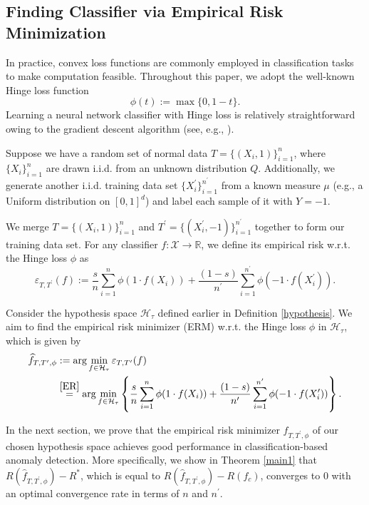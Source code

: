 \documentclass{article}
\def\RR{\mathbb R}
\begin{document}
\subsection{Finding Classifier via Empirical Risk Minimization}
In practice, convex loss functions are commonly employed in classification tasks to make computation feasible.  
Throughout this paper, we adopt the well-known Hinge loss function  $$\phi(t):= \max \{0,1-t\}.$$
Learning a neural network classifier with Hinge loss is relatively straightforward owing to the gradient descent algorithm (see, e.g., \citep{molitor2021bias, george2023training}). 

Suppose we have a random set of normal data $T= \{(X_i,1)\}_{i=1}^{n}$, where  $\{X_i\}_{i=1}^{n}$ are drawn i.i.d. from an unknown distribution $Q$.  
 Additionally, we generate another i.i.d. training data set $\{X_i^\prime\}_{i=1}^{n^\prime}$ from a known measure $\mu$ (e.g., a Uniform distribution on $[0,1]^d$) and label each sample of it with $Y=-1$.
 
We merge $T= \{(X_i,1)\}_{i=1}^{n}$ and $T^\prime= \{(X_i^\prime,-1)\}_{i=1}^{n^\prime}$ together to form our training data set.
For any classifier $f: \mathcal{X} \to \RR$, we define its empirical risk w.r.t. the Hinge loss $\phi$ as 
\begin{equation}\label{ER}
    \varepsilon_{T,T^\prime} (f):=\frac{s}{n} \sum_{i=1}^{n} \phi\left(1 \cdot f(X_i)\right) + \frac{(1-s) }{n^\prime}\sum_{i=1}^{n^\prime}\phi(-1 \cdot f(X^\prime_i)). 
\end{equation}

Consider the hypothesis space $\mathcal{H}_\tau$ defined earlier in Definition \ref{hypothesis}. 
We aim to find the empirical risk minimizer (ERM) w.r.t. the Hinge loss $\phi$ in $\mathcal{H}_\tau$, which is given by
\begin{align}\label{ERM}
    \widehat{f}_{T, T^\prime,\phi} 
    &:= \arg \min_{f\in\mathcal{H}_\tau} \varepsilon_{T,T^\prime} (f) \nonumber\\
    &\stackrel{\mbox{\eqref{ER}}}{=} \arg \min_{f\in\mathcal{H}_\tau} \left\{ \frac{s}{n}\sum_{i=1}^{n}\phi(1 \cdot f(X_i)) + \frac{(1-s)}{n^\prime}\sum_{i=1}^{n^\prime}\phi(-1 \cdot f(X^\prime_i))\right\}. 
\end{align}

In the next section, we prove that the empirical risk minimizer $\widehat{f}_{T, T^\prime,\phi}$ of our chosen hypothesis space achieves good performance in classification-based anomaly detection. 
More specifically, we show in Theorem \ref{main1} that $R\left(\widehat{f}_{T, T^\prime,\phi}\right) - R^*$, which is equal to $R\left(\widehat{f}_{T, T^\prime,\phi}\right) - R (f_c)$, converges to $0$ with an optimal convergence rate in terms of $n$ and $n^\prime$.
\end{document}
